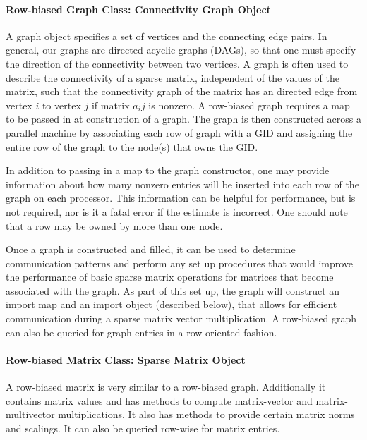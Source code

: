 \documentclass[12pt,relax]{PetraObjectModel}
\begin{document}
\paragraph{Row-biased Graph Class:  Connectivity Graph Object}

A graph object specifies a set of vertices and the connecting edge pairs.   
In general, our graphs are directed acyclic graphs (DAGs), so that one must 
specify the direction of the connectivity between two vertices.  A graph is often 
used to describe the connectivity of a sparse matrix, independent of the values 
of the matrix, such that the connectivity graph of the matrix has an directed 
edge from vertex $i$ to vertex $j$ if matrix $a_ij$ is nonzero.  A row-biased 
graph requires a map to be passed in at construction of a graph. The graph is 
then constructed across a parallel machine by associating each row of graph 
with a GID and assigning the entire row of the graph to the node(s) that owns the GID.  

In addition to passing in a map to the graph constructor, one may provide information 
about how many nonzero entries will be inserted into each row of the graph on each 
processor.  This information can be helpful for performance, but is not required, 
nor is it a fatal error if the estimate is incorrect.  One should note that a row 
may be owned by more than one node.

Once a graph is constructed and filled, it can be used to determine communication 
patterns and perform any set up procedures that would improve the performance of 
basic sparse matrix operations for matrices that become associated with the graph.  
As part of this set up, the graph will construct an import map and an import object 
(described below), that allows for efficient communication during a sparse matrix 
vector multiplication. A row-biased graph can also be queried for graph entries in a 
row-oriented fashion.

\paragraph{Row-biased Matrix Class: Sparse Matrix Object}

A row-biased matrix is very similar to a row-biased graph.   Additionally it 
contains matrix values and has methods to compute matrix-vector and matrix-multivector 
multiplications.  It also has methods to provide certain matrix norms and scalings.  
It can also be queried row-wise for matrix entries.
\end{document}
